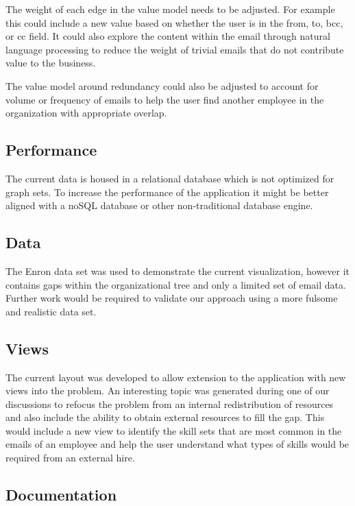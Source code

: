 \message{ !name(FinalPaper.tex)}\documentclass[journal]{vgtc}                %
\begin{document}
The weight of each edge in the value model needs to be adjusted.  For example this could include a new value based on whether the user is in the from, to, bcc, or cc field.  It could also explore the content within the email through natural language processing to reduce the weight of trivial emails that do not contribute value to the business.

The value model around redundancy could also be adjusted to account for volume or frequency of emails to help the user find another employee in the organization with appropriate overlap.

\subsection{Performance}

The current data is housed in a relational database which is not optimized for graph sets.  To increase the performance of the application it might be better aligned with a noSQL database or other non-traditional database engine.

\subsection{Data}

The Enron data set was used to demonstrate the current visualization, however it contains gaps within the organizational tree and only a limited set of email data.  Further work would be required to validate our approach using a more fulsome and realistic data set.

\subsection{Views}

The current layout was developed to allow extension to the application with new views into the problem.  An interesting topic was generated during one of our discussions to refocus the problem from an internal redistribution of resources and also include the ability to obtain external resources to fill the gap.  This would include a new view to identify the skill sets that are most common in the emails of an employee and help the user understand what types of skills would be required from an external hire.

\subsection{Documentation}
\end{document}
